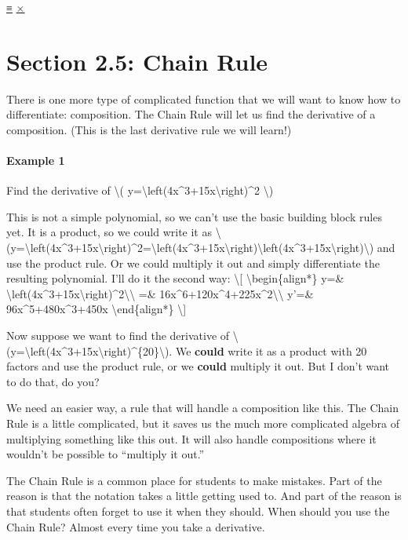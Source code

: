 \protect\hyperlink{main-nav}{≡} \protect\hyperlink{close-nav}{×}

\hypertarget{section-2.5-chain-rule}{%
\section{Section 2.5: Chain Rule}\label{section-2.5-chain-rule}}

There is one more type of complicated function that we will want to know
how to differentiate: composition. The Chain Rule will let us find the
derivative of a composition. (This is the last derivative rule we will
learn!)

\hypertarget{example-1}{%
\paragraph{Example 1}\label{example-1}}

Find the derivative of \textbackslash{}(
y=\textbackslash{}left(4x\^{}3+15x\textbackslash{}right)\^{}2
\textbackslash{})

This is not a simple polynomial, so we can't use the basic building
block rules yet. It is a product, so we could write it as
\textbackslash{}(y=\textbackslash{}left(4x\^{}3+15x\textbackslash{}right)\^{}2=\textbackslash{}left(4x\^{}3+15x\textbackslash{}right)\textbackslash{}left(4x\^{}3+15x\textbackslash{}right)\textbackslash{})
and use the product rule. Or we could multiply it out and simply
differentiate the resulting polynomial. I'll do it the second way:
\textbackslash{}{[} \textbackslash{}begin\{align*\} y=\&
\textbackslash{}left(4x\^{}3+15x\textbackslash{}right)\^{}2\textbackslash{}\textbackslash{}
=\& 16x\^{}6+120x\^{}4+225x\^{}2\textbackslash{}\textbackslash{} y'=\&
96x\^{}5+480x\^{}3+450x \textbackslash{}end\{align*\}
\textbackslash{}{]}

Now suppose we want to find the derivative of
\textbackslash{}(y=\textbackslash{}left(4x\^{}3+15x\textbackslash{}right)\^{}\{20\}\textbackslash{}).
We \textbf{could} write it as a product with 20 factors and use the
product rule, or we \textbf{could} multiply it out. But I don't want to
do that, do you?

We need an easier way, a rule that will handle a composition like this.
The Chain Rule is a little complicated, but it saves us the much more
complicated algebra of multiplying something like this out. It will also
handle compositions where it wouldn't be possible to ``multiply it
out.''

The Chain Rule is a common place for students to make mistakes. Part of
the reason is that the notation takes a little getting used to. And part
of the reason is that students often forget to use it when they should.
When should you use the Chain Rule? Almost every time you take a
derivative.

